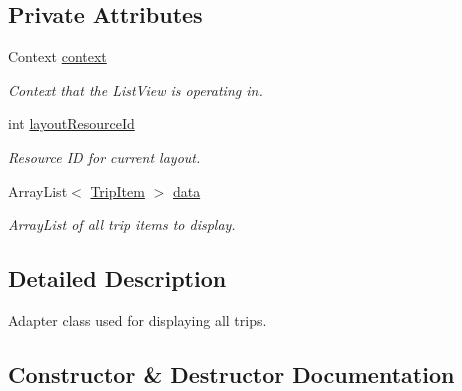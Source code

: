 \subsection*{Private Attributes}
\begin{DoxyCompactItemize}
\item 
\mbox{\label{classcom_1_1jack_1_1motorbikestatistics_1_1_trip_list_adapter_abe987d1818dcbad467b56142acb55447}} 
Context \hyperlink{classcom_1_1jack_1_1motorbikestatistics_1_1_trip_list_adapter_abe987d1818dcbad467b56142acb55447}{context}
\begin{DoxyCompactList}\small\item\em Context that the List\+View is operating in. \end{DoxyCompactList}\item 
\mbox{\label{classcom_1_1jack_1_1motorbikestatistics_1_1_trip_list_adapter_a72f8d17ad7f1dc531cbe0015b2f29454}} 
int \hyperlink{classcom_1_1jack_1_1motorbikestatistics_1_1_trip_list_adapter_a72f8d17ad7f1dc531cbe0015b2f29454}{layout\+Resource\+Id}
\begin{DoxyCompactList}\small\item\em Resource ID for current layout. \end{DoxyCompactList}\item 
\mbox{\label{classcom_1_1jack_1_1motorbikestatistics_1_1_trip_list_adapter_af0219927cf42917085d1e43abf62374d}} 
Array\+List$<$ \hyperlink{classcom_1_1jack_1_1motorbikestatistics_1_1_trip_item}{Trip\+Item} $>$ \hyperlink{classcom_1_1jack_1_1motorbikestatistics_1_1_trip_list_adapter_af0219927cf42917085d1e43abf62374d}{data}
\begin{DoxyCompactList}\small\item\em Array\+List of all trip items to display. \end{DoxyCompactList}\end{DoxyCompactItemize}


\subsection{Detailed Description}
Adapter class used for displaying all trips. 

\subsection{Constructor \& Destructor Documentation}
\mbox{\label{classcom_1_1jack_1_1motorbikestatistics_1_1_trip_list_adapter_ace5ca232bac9a2a6e0d1b61e88b35546}} 
